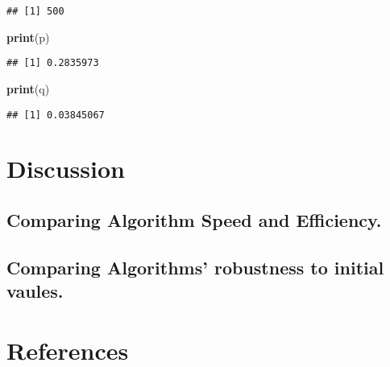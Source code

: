 \documentclass[]{article}
\newenvironment{Shaded}{\begin{snugshade}}{\end{snugshade}}
\newcommand{\KeywordTok}[1]{\textcolor[rgb]{0.13,0.29,0.53}{\textbf{#1}}}
\newcommand{\NormalTok}[1]{#1}
\begin{document}
\begin{verbatim}
## [1] 500
\end{verbatim}

\begin{Shaded}
\begin{Highlighting}[]
\KeywordTok{print}\NormalTok{(p)}
\end{Highlighting}
\end{Shaded}

\begin{verbatim}
## [1] 0.2835973
\end{verbatim}

\begin{Shaded}
\begin{Highlighting}[]
\KeywordTok{print}\NormalTok{(q)}
\end{Highlighting}
\end{Shaded}

\begin{verbatim}
## [1] 0.03845067
\end{verbatim}

\section{Discussion}\label{discussion}

\subsection{Comparing Algorithm Speed and
Efficiency.}\label{comparing-algorithm-speed-and-efficiency.}

\subsection{Comparing Algorithms' robustness to initial
vaules.}\label{comparing-algorithms-robustness-to-initial-vaules.}

\subsection{}\label{section}

\section{References}\label{references}
\end{document}
